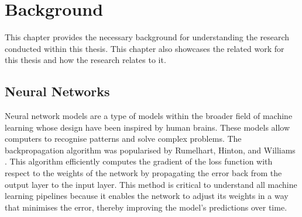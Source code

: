 ﻿\chapter{Background}
\label{ch:background}




This chapter provides the necessary background for understanding the research conducted within this thesis. This chapter also showcases the related work for this thesis and how the research relates to it.




\section{Neural Networks}


Neural network models are a type of models within the broader field of machine learning whose design have been inspired by human brains. These models allow computers to recognise patterns and solve complex problems. The backpropagation algorithm was popularised by Rumelhart, Hinton, and Williams \cite{rumelhart_learning_1986}. This algorithm efficiently computes the gradient of the loss function with respect to the weights of the network by propagating the error back from the output layer to the input layer. This method is critical to understand all machine learning pipelines because it enables the network to adjust its weights in a way that minimises the error, thereby improving the model's predictions over time.


